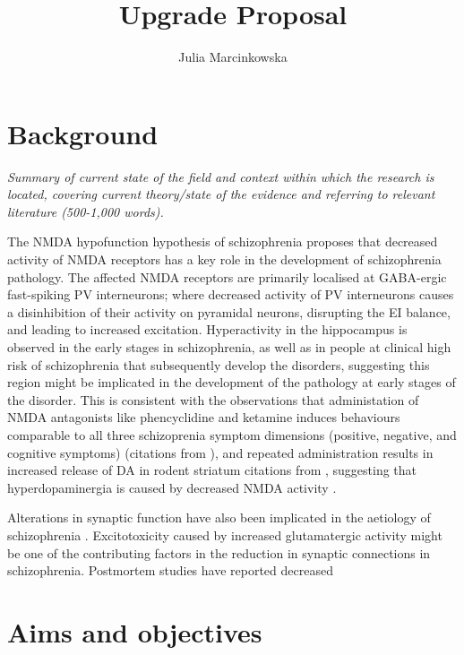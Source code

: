\documentclass[
  letterpaper,
  DIV=11,
  numbers=noendperiod]{scrartcl}
\title{Upgrade Proposal}
\author{Julia Marcinkowska}
\date{}
\begin{document}
\maketitle

\section{Background}\label{background}

\emph{Summary of current state of the field and context within which the
research is located, covering current theory/state of the evidence and
referring to relevant literature (500-1,000 words).}

The {NMDA} hypofunction hypothesis of schizophrenia proposes that
decreased activity of {NMDA} receptors has a key role in the development
of schizophrenia pathology. The affected {NMDA} receptors are primarily
localised at {GABA}-ergic fast-spiking {PV} interneurons; where
decreased activity of {PV} interneurons causes a disinhibition of their
activity on pyramidal neurons, disrupting the {EI} balance, and leading
to increased excitation. Hyperactivity in the hippocampus is observed in
the early stages in schizophrenia, as well as in people at clinical high
risk of schizophrenia that subsequently develop the disorders,
suggesting this region might be implicated in the development of the
pathology at early stages of the disorder. This is consistent with the
observations that administation of {NMDA} antagonists like phencyclidine
and ketamine induces behaviours comparable to all three schizoprenia
symptom dimensions (positive, negative, and cognitive symptoms)
(citations from \autocite{nakazawa_origin_2020}), and repeated
administration results in increased release of {DA} in rodent striatum
citations from \autocite{nakazawa_origin_2020}, suggesting that
hyperdopaminergia is caused by decreased {NMDA} activity
\autocite{grace_dopamine_2012,grace_dysregulation_2016}.

Alterations in synaptic function have also been implicated in the
aetiology of schizophrenia \autocite{howes_synaptic_2023}.
Excitotoxicity caused by increased glutamatergic activity might be one
of the contributing factors in the reduction in synaptic connections in
schizophrenia. Postmortem studies have reported decreased
\autocite{abdallah_effects_2018}

\section{Aims and objectives}\label{aims-and-objectives}
\end{document}

